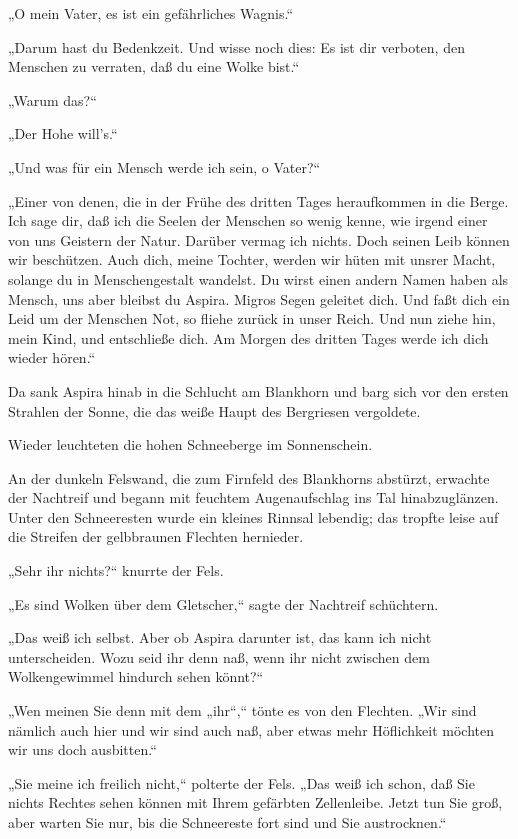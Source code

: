 „O mein Vater, es ist ein gefährliches Wagnis.“

„Darum hast du Bedenkzeit. Und wisse noch dies: Es ist dir
verboten, den Menschen zu verraten, daß du eine Wolke bist.“

„Warum das?“

„Der Hohe will's.“

„Und was für ein Mensch werde ich sein, o Vater?“

„Einer von denen, die in der Frühe des dritten Tages heraufkommen
in die Berge. Ich sage dir, daß ich die Seelen der Menschen so
wenig kenne, wie irgend einer von uns Geistern der Natur. Darüber
vermag ich nichts. Doch seinen Leib können wir beschützen. Auch
dich, meine Tochter, werden wir hüten mit unsrer Macht, solange du
in Menschengestalt wandelst. Du wirst einen andern Namen haben als
Mensch, uns aber bleibst du Aspira. Migros Segen geleitet dich. Und
faßt dich ein Leid um der Menschen Not, so fliehe zurück in unser
Reich. Und nun ziehe hin, mein Kind, und entschließe dich. Am
Morgen des dritten Tages werde ich dich wieder hören.“

Da sank Aspira hinab in die Schlucht am Blankhorn und barg sich vor
den ersten Strahlen der Sonne, die das weiße Haupt des Bergriesen
vergoldete.

Wieder leuchteten die hohen Schneeberge im Sonnenschein.

An der dunkeln Felswand, die zum Firnfeld des Blankhorns abstürzt,
erwachte der Nachtreif und begann mit feuchtem Augenaufschlag ins
Tal hinabzuglänzen. Unter den Schneeresten wurde ein kleines
Rinnsal lebendig; das tropfte leise auf die Streifen der
gelbbraunen Flechten hernieder.

„Sehr ihr nichts?“ knurrte der Fels.

„Es sind Wolken über dem Gletscher,“ sagte der Nachtreif
schüchtern.

„Das weiß ich selbst. Aber ob Aspira darunter ist, das kann ich
nicht unterscheiden. Wozu seid ihr denn naß, wenn ihr nicht
zwischen dem Wolkengewimmel hindurch sehen könnt?“

„Wen meinen Sie denn mit dem „ihr“,“ tönte es von den Flechten.
„Wir sind nämlich auch hier und wir sind auch naß, aber etwas mehr
Höflichkeit möchten wir uns doch ausbitten.“

„Sie meine ich freilich nicht,“ polterte der Fels. „Das weiß ich
schon, daß Sie nichts Rechtes sehen können mit Ihrem gefärbten
Zellenleibe. Jetzt tun Sie groß, aber warten Sie nur, bis die
Schneereste fort sind und Sie austrocknen.“

